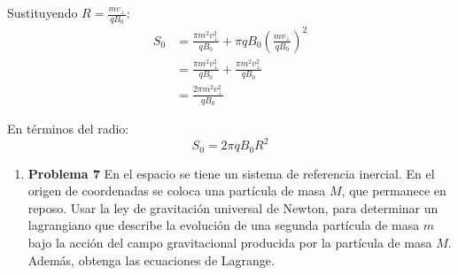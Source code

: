 \documentclass{article}
\begin{document}
Sustituyendo $R = \frac{m v_{\perp}}{qB_0}$:
\begin{align}
S_0 &= \frac{\pi m^2 v_{\perp}^2}{qB_0} + \pi qB_0 \left(\frac{m v_{\perp}}{qB_0}\right)^2 \\
&= \frac{\pi m^2 v_{\perp}^2}{qB_0} + \frac{\pi m^2 v_{\perp}^2}{qB_0} \\
&= \frac{2\pi m^2 v_{\perp}^2}{qB_0}
\end{align}

En términos del radio:
\begin{equation}
S_0 = 2\pi q B_0 R^2
\end{equation} 

\vspace{0.5cm}
\begin{center}
\end{center}  \vspace{0.5cm}


\begin{enumerate}[label={{\textcolor{trueblue}{\textbf{Pr.} \arabic*.7}}}, start=2]
  \item \textbf{Problema 7} En el espacio se tiene un sistema de referencia inercial. En el origen de coordenadas se coloca una partícula de masa $M$, que permanece en reposo. Usar la ley de gravitación universal de Newton, para determinar un lagrangiano que describe la evolución de una segunda partícula de masa $m$ bajo la acción del campo gravitacional producida por la partícula de masa $M$. Además, obtenga las ecuaciones de Lagrange.
\end{enumerate}
\end{document}
